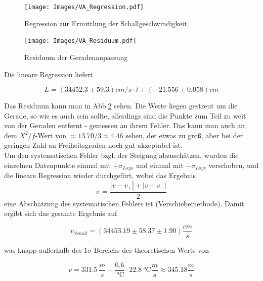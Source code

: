 \documentclass[]{article}
\begin{document}
	
	\begin{figure}
	\begin{center}
		\texttt{[image: Images/VA\_Regression.pdf]}
		\caption{Regression zur Ermittlung der Schallgeschwindigkeit}
		\label{Va_Reg}
	\end{center}
	\end{figure}
	

	\begin{figure}
	\begin{center}
		\texttt{[image: Images/VA\_Residuum.pdf]}
		\caption{Residuum der Geradenanpassung}
		\label{Va_Res}
	\end{center}
	\end{figure}
	
Die lineare Regression liefert

\begin{equation*}
L = (34452.3\pm59.3) cm/s\cdot t+ (-21.556 \pm 0.058)cm
\end{equation*}

Das Residuum kann man in Abb.\ref{Va_Res} sehen. Die Werte liegen gestreut um die Gerade, so wie es auch sein sollte, allerdings sind die Punkte zum Teil zu weit von der Geraden entfernt - gemessen an ihrem Fehler. Das kann man auch an dem $X^2/f$-Wert von $\approx13.70/3\approx4.46$ sehen, der etwas zu groß, aber bei der geringen Zahl an Freiheitsgraden noch gut akzeptabel ist. \\

Um den systematischen Fehler bzgl. der Steigung abzuschätzen, wurden die einzelnen Datenpunkte einmal mit $+\sigma_{Lsys}$ und einmal mit $-\sigma_{Lsys}$ verschoben, und die lineare Regression wieder durchgefürt, wobei das Ergebnis
\begin{equation}
	\sigma = \frac{|v-v_+|+|v-v_-|}{2}
\end{equation}
eine Abschätzung des systematischen Fehlers ist (Verschiebemethode). Damit ergibt sich das gesamte Ergebnis auf

\begin{equation*}
	v_{Schall} = (34453.19\pm58.37\pm1.90) \frac{cm}{s}
\end{equation*}

was knapp außerhalb des $1\sigma$-Bereichs des theoretischen Werts von

\begin{equation*}
v = 331.5 \, \frac{m}{s} +\frac{0.6}{\SI{} {\celsius}} \cdot \SI{22.8}{\celsius} \frac{m}{s} \approx 345.18 \frac{m}{s}
\end{equation*}
\end{document}
